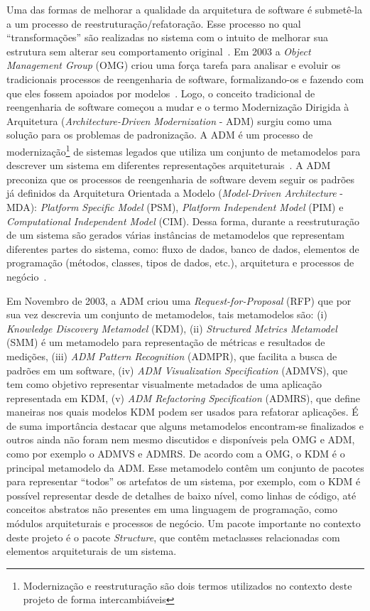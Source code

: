 \documentclass[12pt]{article}
\begin{document}
Uma das formas de melhorar a qualidade da arquitetura de software é submetê-la a um processo de reestruturação/refatoração. Esse processo no qual ``transformações'' são realizadas no sistema com o intuito de melhorar sua estrutura sem alterar seu comportamento original~\cite{Canfora2011}. Em 2003 a \textit{Object Management Group} (OMG) criou uma força tarefa para analisar e evoluir os tradicionais processos de reengenharia de software, formalizando-os e fazendo com que eles fossem apoiados por modelos~\cite{OMGADM}. Logo, o conceito tradicional de reengenharia de software começou a mudar e o termo Modernização Dirigida à Arquitetura (\textit{Architecture-Driven Modernization} - ADM) surgiu como uma solução para os problemas de padronização. A ADM é um processo de modernização\footnote{Modernização e reestruturação são dois termos utilizados no contexto deste projeto de forma intercambiáveis} de sistemas legados que utiliza um conjunto de metamodelos para descrever um sistema em diferentes representações arquiteturais~\cite{ADM:OMG}. A ADM preconiza que os processos de reengenharia de software devem seguir os padrões já definidos da Arquitetura Orientada a Modelo (\textit{Model-Driven Architecture} - MDA): \textit{Platform Specific Model} (PSM), \textit{Platform Independent Model} (PIM) e \textit{Computational Independent Model} (CIM). Dessa forma, durante a reestruturação de um sistema são gerados várias instâncias de metamodelos que representam diferentes partes do sistema, como: fluxo de dados, banco de dados, elementos de programação (métodos, classes, tipos de dados, etc.), arquitetura e processos de negócio~\cite{Kleppe:2003, PerezCastillo:2011jo}. 

Em Novembro de 2003, a ADM criou uma \textit{Request-for-Proposal} (RFP) que por sua vez descrevia um conjunto de metamodelos, tais metamodelos são: (i) \textit{Knowledge Discovery Metamodel} (KDM), (ii) \textit{Structured Metrics Metamodel} (SMM) é um metamodelo para representação de métricas e resultados de medições, (iii) \textit{ADM Pattern Recognition} (ADMPR), que facilita a busca de padrões em um software, (iv) \textit{ADM Visualization Specification} (ADMVS), que tem como objetivo representar visualmente metadados de uma aplicação representada em KDM, (v) \textit{ADM Refactoring Specification} (ADMRS), que define maneiras nos quais modelos KDM podem ser usados para refatorar aplicações. É de suma importância destacar que alguns metamodelos encontram-se finalizados e outros ainda não foram nem mesmo discutidos e disponíveis pela OMG e ADM, como por exemplo o ADMVS e ADMRS. De acordo com a OMG, o KDM é o principal metamodelo da ADM. Esse metamodelo contêm um conjunto de pacotes para representar ``todos'' os artefatos de um sistema, por exemplo, com o KDM é possível representar desde de detalhes de baixo nível, como linhas de código, até conceitos abstratos não presentes em uma linguagem de programação, como módulos arquiteturais e processos de negócio. Um pacote importante no contexto deste projeto é o pacote \textit{Structure}, que contêm metaclasses relacionadas com elementos arquiteturais de um sistema.
\end{document}
